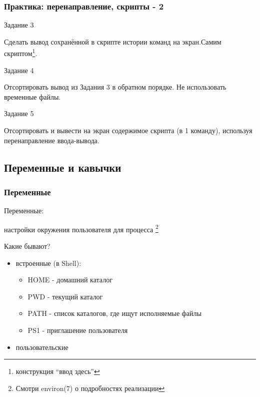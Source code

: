 \begin{frame}
  \frametitle{Практика: перенаправление, скрипты - 2}

  \alert{Задание 3}
  
  Сделать вывод сохранённой в скрипте истории команд на экран.\newline Самим скриптом\footnote{конструкция ``ввод здесь''}.

  \pause

  \alert{Задание 4}

  Отсортировать вывод из \alert{Задания 3} в обратном порядке. \newline Не использовать временные файлы.
  
  \pause

  \alert{Задание 5} 

  Отсортировать и вывести на экран содержимое скрипта (в 1 команду), используя перенаправление ввода-вывода.


\end{frame}

\subsection{Переменные и кавычки}

\begin{frame}[fragile]
  \frametitle{Переменные}

  \Large{\alert{Переменные:}}
  
  \normalsize{настройки окружения пользователя для процесса}
  \footnote{Смотри environ(7) о подробностях реализации} \newline

  \pause 

  \Large{\alert{Какие бывают?}}
  \normalsize{ }
  \begin{itemize}
    \item встроенные (в Shell): 
      \begin{itemize}
	\item HOME - домашний каталог
	\item PWD - текущий каталог
	\item PATH - список каталогов, где ищут исполняемые файлы
	\item PS1 - приглашение пользователя
      \end{itemize}
    \item пользовательские 
  \end{itemize} 

\end{frame}

